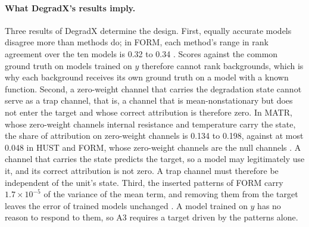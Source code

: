 \documentclass{article}
\begin{document}
\paragraph{What DegradX's results imply.} Three results of DegradX determine the design. First, equally accurate models disagree more than methods do; in FORM, each method's range in rank agreement over the ten models is 0.32 to 0.34 \citep{degradx2026}. Scores against the common ground truth on models trained on $y$ therefore cannot rank backgrounds, which is why each background receives its own ground truth on a model with a known function. Second, a zero-weight channel that carries the degradation state cannot serve as a trap channel, that is, a channel that is mean-nonstationary but does not enter the target and whose correct attribution is therefore zero. In MATR, whose zero-weight channels internal resistance and temperature carry the state, the share of attribution on zero-weight channels is 0.134 to 0.198, against at most 0.048 in HUST and FORM, whose zero-weight channels are the null channels \citep{degradx2026}. A channel that carries the state predicts the target, so a model may legitimately use it, and its correct attribution is not zero. A trap channel must therefore be independent of the unit's state. Third, the inserted patterns of FORM carry $1.7\times10^{-5}$ of the variance of the mean term, and removing them from the target leaves the error of trained models unchanged \citep{degradx2026}. A model trained on $y$ has no reason to respond to them, so A3 requires a target driven by the patterns alone.
\end{document}

